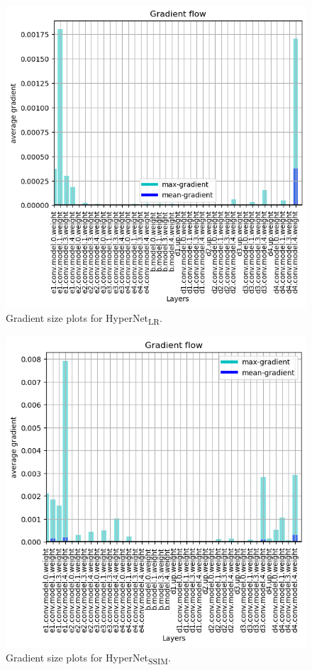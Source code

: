 \documentclass{article}
\begin{document}
\begin{figure}[!htb]
    \centering
    \includegraphics[width=\textwidth]{figs/ClassicUnet_LR/grads/grads999.png}
    \caption{Gradient size plots for HyperNet\textsubscript{LR}.}
    \label{fig:UnetLR_grads}
\end{figure}

\begin{figure}[!htb]
    \centering
    \includegraphics[width=\textwidth]{figs/ClassicUnetSSIM_LR/grads/grads999.png}
    \caption{Gradient size plots for HyperNet\textsubscript{SSIM}.}
    \label{fig:UnetSSIM_grads}
\end{figure}
\end{document}
